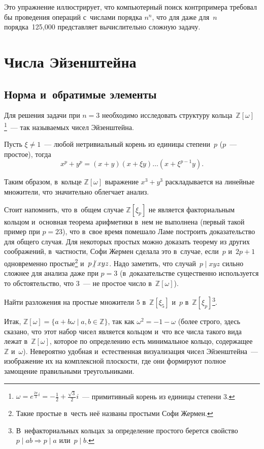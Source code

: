 \documentclass{article}
\begin{document}
Это упражнение иллюстрирует, что компьютерный поиск контрпримера требовал бы
проведения операций с~числами порядка $n^n$, что для даже для~$n$
порядка~125,000 представляет вычислительно сложную задачу.

\section{Числа Эйзенштейна}

\subsection{Норма и~обратимые элементы}

Для решения задачи при $n = 3$ необходимо исследовать структуру
кольца~$\mathbb{Z}[\omega]$\footnote{$\omega = e^{\frac{2\pi}{3}i} =
-\frac{1}{2} + \frac{\sqrt{3}}{2}i$~--- примитивный корень из единицы степени
3.}~--- так называемых чисел Эйзенштейна.

\begin{exercise}
  Пусть $\xi \ne 1$~--- любой нетривиальный корень из единицы
  степени~$p$ ($p$~--- простое), тогда
  $$x^p + y^p = (x + y)(x + \xi y) \ldots (x + \xi^{p-1} y).$$
\end{exercise}

Таким образом, в~кольце $\mathbb{Z}[\omega]$ выражение $x^3 + y^3$
раскладывается на линейные множители, что значительно облегчает анализ.

Стоит напомнить, что в~общем случае $\mathbb{Z}[\xi_p]$ не является
факториальным кольцом и~основная теорема арифметики в~нем не выполнена (первый
такой пример при $p = 23$), что в~свое время помешало Ламе построить
доказательство для общего случая. Для некоторых простых можно доказать теорему
из других соображений, в~частности, Софи Жермен сделала это в~случае,
если~$p$ и~$2p + 1$ одновременно простые\footnote{Такие простые в~честь неё
названы простыми Софи Жермен.} и~$p \ndiv xyz$. Надо заметить, что
случай~$p \mid xyz$ сильно сложнее для анализа даже при $p = 3$
(в~доказательстве существенно используется то обстоятельство, что $3$~--- не
простое число в~$\mathbb{Z}[\omega]$).
\begin{exercise}[сложное]
  Найти разложения на простые множители $5$ в~$\mathbb{Z}[\xi_5]$ и~$p$
  в~$\mathbb{Z}[\xi_p]$\footnote{В~нефакториальных кольцах за определение
  простого берется свойство $p \mid ab \Rightarrow p \mid a$ или~$p \mid b$.}.
\end{exercise}

Итак, $\mathbb{Z}[\omega] = \{a + b \omega \mid a, b \in \mathbb{Z} \}$, так как
$\omega^2 = -1 - \omega$ (более строго, здесь сказано, что этот набор чисел
является кольцом и~что все числа такого вида лежат в~$\mathbb{Z}[\omega]$,
которое по определению есть минимальное кольцо,
содержащее~$\mathbb{Z}$ и~$\omega$). Невероятно удобная и~естественная
визуализация чисел Эйзенштейна~--- изображение их на комплексной плоскости,
где они формируют полное замощение правильными треугольниками.
\end{document}

